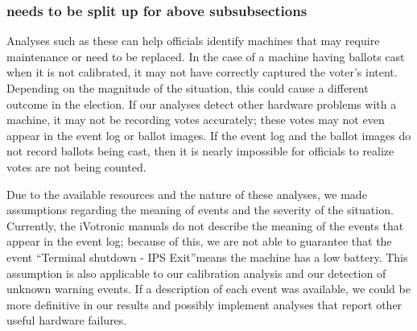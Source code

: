 \subsubsection{needs to be split up for above subsubsections}
Analyses such as these can help officials identify machines that may require maintenance or need to be replaced.  In the case of a machine having ballots cast when it is not calibrated, it may not have correctly captured the voter's intent.  Depending on the magnitude of the situation, this could cause a different outcome in the election.  If our analyses detect other hardware problems with a machine, it may not be recording votes accurately; these votes may not even appear in the event log or ballot images.  If the event log and the ballot images do not record ballots being cast, then it is nearly impossible for officials to realize votes are not being counted.  

Due to the available resources and the nature of these analyses, we made assumptions regarding the meaning of events and the severity of the situation.  Currently, the iVotronic manuals do not describe the meaning of the events that appear in the event log; because of this, we are not able to guarantee that the event \textquotedblleft Terminal shutdown - IPS Exit\textquotedblright means the machine has a low battery.  This assumption is also applicable to our calibration analysis and our detection of unknown warning events.  If a description of each event was available, we could be more definitive in our results and possibly implement analyses that report other useful hardware failures.    
